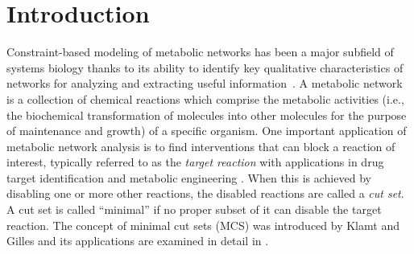 \documentclass{bioinfo}
\theoremstyle{plain}
\theoremstyle{definition}
\begin{document}
\maketitle

\section{Introduction}
Constraint-based modeling of metabolic networks has been a major subfield of systems biology thanks to its ability to identify key qualitative characteristics of networks for analyzing and extracting useful information~\cite{Price, cbm1, cbm2}. %
A metabolic network is a collection of chemical reactions which comprise the  metabolic activities (i.e., the biochemical transformation of molecules into other molecules for the purpose of maintenance and growth) of a specific organism. One important application of metabolic network analysis is to find interventions that can block a reaction of interest, typically referred to as the \textit{target reaction}  with applications in drug target identification \cite{DrugTarget,ecloi_bio, growth, pathway, engineering} and metabolic engineering \cite{MetabEng}. When this is achieved by disabling one or more other reactions, the disabled reactions are called a \emph{cut set}. A cut set is called ``minimal'' if no proper subset of it can disable the target reaction. The concept of minimal cut sets (MCS) was introduced by Klamt and Gilles \cite{MCS} and its applications are examined in detail in \cite{MCS2}. %
\end{document}
